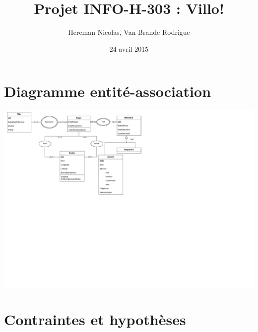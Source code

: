 \documentclass[a4paper, 12pt]{report}
\title{Projet INFO-H-303 : Villo!}
\author{Hereman Nicolas, Van Brande Rodrigue}
\date{24 avril 2015}
\begin{document}
\maketitle 

\section*{Diagramme entité-association} %
	\includegraphics[scale=0.8]{entityassocdiagram.pdf}

\section*{Contraintes et hypothèses} %
\end{document}
